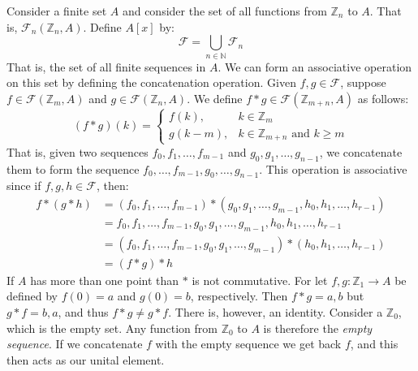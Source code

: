     \begin{example}
        Consider a finite set $A$ and consider the set of all functions from
        $\mathbb{Z}_{n}$ to $A$. That is, $\mathcal{F}_{n}(\mathbb{Z}_{n},A)$.
        Define $A[x]$ by:
        \begin{equation}
            \mathcal{F}=\bigcup_{n\in\mathbb{N}}\mathcal{F}_{n}
        \end{equation}
        That is, the set of all finite sequences in $A$. We can form an
        associative operation on this set by defining the concatenation
        operation. Given $f,g\in\mathcal{F}$, suppose
        $f\in\mathcal{F}(\mathbb{Z}_{m},A)$ and
        $g\in\mathcal{F}(\mathbb{Z}_{n},A)$. We define
        $f*g\in\mathcal{F}(\mathbb{Z}_{m+n},A)$ as follows:
        \begin{equation}
            (f*g)(k)=
            \begin{cases}
                f(k),&k\in\mathbb{Z}_{m}\\
                g(k-m),&k\in\mathbb{Z}_{m+n}\textrm{ and }k\geq{m}
            \end{cases}
        \end{equation}
        That is, given two sequences $f_{0},f_{1},\dots,f_{m-1}$ and
        $g_{0},g_{1},\dots,g_{n-1}$, we concatenate them to form the sequence
        $f_{0},\dots,f_{m-1},g_{0},\dots,g_{n-1}$. This operation is associative
        since if $f,g,h\in\mathcal{F}$, then:
        \begin{subequations}
            \begin{align}
                f*(g*h)&=(f_{0},f_{1},\dots,f_{m-1})
                    *(g_{0},g_{1},\dots,g_{m-1},h_{0},h_{1},\dots,h_{r-1})\\
                &=f_{0},f_{1},\dots,f_{m-1},
                    g_{0},g_{1},\dots,g_{m-1},h_{0},h_{1},\dots,h_{r-1}\\
                &=(f_{0},f_{1},\dots,f_{m-1},
                    g_{0},g_{1},\dots,g_{m-1})*(h_{0},h_{1},\dots,h_{r-1})\\
                &=(f*g)*h
            \end{align}
        \end{subequations}
        If $A$ has more than one point than $*$ is not commutative. For let
        $f,g:\mathbb{Z}_{1}\rightarrow{A}$ be defined by $f(0)=a$ and $g(0)=b$,
        respectively. Then $f*g=a,b$ but $g*f=b,a$, and thus $f*g\ne{g}*f$.
        There is, however, an identity. Consider a $\mathbb{Z}_{0}$, which is
        the empty set. Any function from $\mathbb{Z}_{0}$ to $A$ is therefore
        the \textit{empty sequence}. If we concatenate $f$ with the empty
        sequence we get back $f$, and this then acts as our unital element.
    \end{example}
